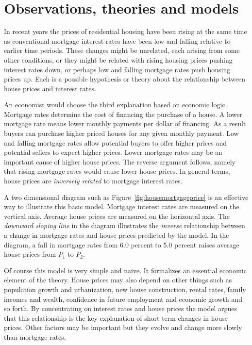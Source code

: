 \section{Observations, theories and models}\label{sec:ch2sec1}

In recent years the prices of residential housing have been rising at the same time as conventional mortgage interest rates have been low and falling relative to earlier time periods. These changes might be unrelated, each arising from some other conditions, or they might be related with rising housing prices pushing interest rates down, or perhaps low and falling mortgage rates push housing prices up. Each is a possible hypothesis or theory about the relationship between house prices and interest rates.

An economist would choose the third explanation based on economic logic. Mortgage rates determine the cost of financing the purchase of a house. A lower mortgage rate means lower monthly payments per dollar of financing. As a result buyers can purchase higher priced houses for any given monthly payment. Low and falling mortgage rates allow potential buyers to offer higher prices and potential sellers to expect higher prices. Lower mortgage rates may be an important cause of higher house prices. The reverse argument follows, namely that rising mortgage rates would cause lower house prices. In general terms, house prices are \textit{inversely related} to mortgage interest rates.

A two dimensional diagram such as Figure~\ref{fig:housemortgageprice} is an effective way to illustrate this basic model. Mortgage interest rates are measured on the vertical axis. Average house prices are measured on the horizontal axis. The \textit{downward sloping line} in the diagram illustrates the \textit{inverse} relationship between a change in mortgage rates and house prices predicted by the model. In the diagram, a fall in mortgage rates from 6.0 percent to 5.0 percent raises average house prices from $P_1$ to $P_2$. 



Of course this model is very simple and naive. It formalizes an essential economic element of the theory. House prices may also depend on other things such as population growth and urbanization, new house construction, rental rates, family incomes and wealth, confidence in future employment and economic growth and so forth. By concentrating on interest rates and house prices the model argues that this relationship is the key explanation of short term changes in house prices. Other factors may be important but they evolve and change more slowly than mortgage rates. 

